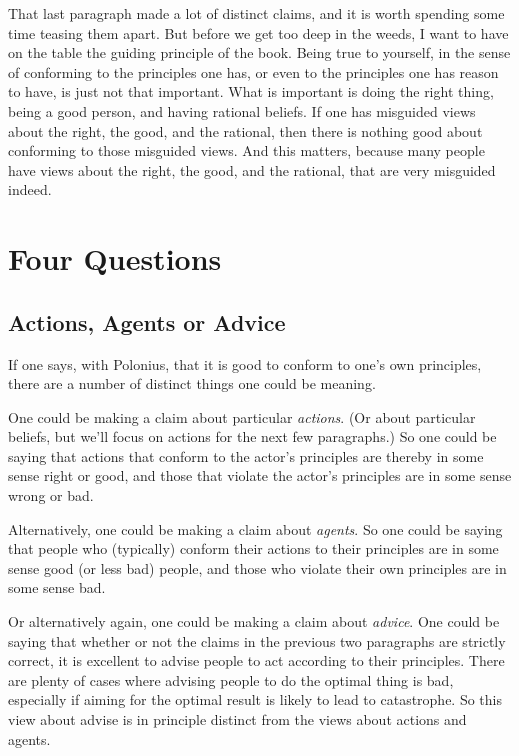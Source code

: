 That last paragraph made a lot of distinct claims, and it is worth spending some time teasing them apart. But before we get too deep in the weeds, I want to have on the table the guiding principle of the book. Being true to yourself, in the sense of conforming to the principles one has, or even to the principles one has reason to have, is just not that important. What is important is doing the right thing, being a good person, and having rational beliefs. If one has misguided views about the right, the good, and the rational, then there is nothing good about conforming to those misguided views. And this matters, because many people have views about the right, the good, and the rational, that are very misguided indeed.

\section{Four Questions}
\label{fourquestions}

\subsection{Actions, Agents or Advice}
\label{actionsagentsoradvice}

If one says, with Polonius, that it is good to conform to one's own principles, there are a number of distinct things one could be meaning.

One could be making a claim about particular \emph{actions}. (Or about particular beliefs, but we'll focus on actions for the next few paragraphs.) So one could be saying that actions that conform to the actor's principles are thereby in some sense right or good, and those that violate the actor's principles are in some sense wrong or bad.

Alternatively, one could be making a claim about \emph{agents}. So one could be saying that people who (typically) conform their actions to their principles are in some sense good (or less bad) people, and those who violate their own principles are in some sense bad.

Or alternatively again, one could be making a claim about \emph{advice}. One could be saying that whether or not the claims in the previous two paragraphs are strictly correct, it is excellent to advise people to act according to their principles. There are plenty of cases where advising people to do the optimal thing is bad, especially if aiming for the optimal result is likely to lead to catastrophe. So this view about advise is in principle distinct from the views about actions and agents.

